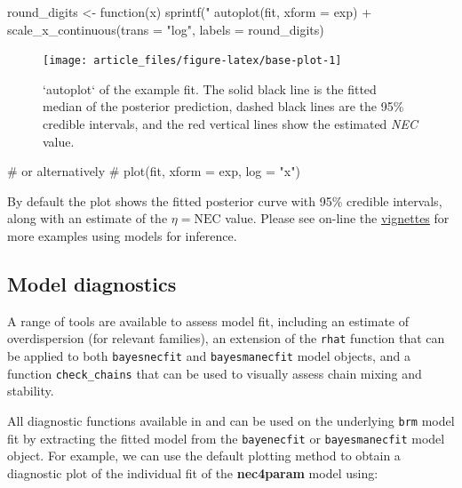 \begin{Schunk}
\begin{Sinput}
round_digits <- function(x) sprintf("%
autoplot(fit, xform = exp) +
  scale_x_continuous(trans = "log", labels = round_digits)
\end{Sinput}
\begin{figure}[!ht]

{\centering \texttt{[image: article\_files/figure-latex/base-plot-1]} 

}

\caption{ `autoplot` of the example fit. The solid black line is the fitted median of the posterior prediction, dashed black lines are the 95\% credible intervals, and the red vertical lines show the estimated \textit{NEC} value.}\label{fig:base-plot}
\end{figure}
\begin{Sinput}
# or alternatively
# plot(fit, xform = exp, log = "x")
\end{Sinput}
\end{Schunk}

By default the plot shows the fitted posterior curve with 95\% credible
intervals, along with an estimate of the \(\eta = \text{NEC}\) value.
Please see on-line the
\href{https://open-aims.github.io/bayesnec/articles/}{vignettes} for
more examples using  models for inference.

\hypertarget{model-diagnostics}{%
\subsection{Model diagnostics}\label{model-diagnostics}}

A range of tools are available to assess model fit, including an
estimate of overdispersion (for relevant families), an extension of the
 \texttt{rhat} function that can be applied to both
\texttt{bayesnecfit} and \texttt{bayesmanecfit} model objects, and a
function \texttt{check\_chains} that can be used to visually assess
chain mixing and stability.

All diagnostic functions available in  and  can be
used on the underlying \texttt{brm} model fit by extracting the fitted
 model from the \texttt{bayenecfit} or \texttt{bayesmanecfit}
model object. For example, we can use the default  plotting
method to obtain a diagnostic plot of the individual fit of the
\textbf{nec4param} model using:

\newpage

